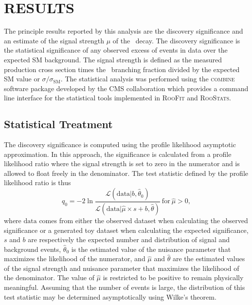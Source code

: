 \chapter{RESULTS} \label{results}

The principle results reported by this analysis are the discovery significance and an estimate of the signal strength $\mu$ of the \VHbb\ decay. The discovery significance is the statistical significance of any observed excess of events in data over the expected SM background. The signal strength is defined as the measured production cross section times the \Htobb\ branching fraction divided by the expected SM value or $\sigma / \sigma_{\textrm{SM}}$. The statistical analysis was performed using the \textsc{combine}\cite{HIGGSCOMBINE} software package developed by the CMS collaboration which provides a command line interface for the statistical tools implemented in \textsc{RooFit}\cite{ROOFIT} and \textsc{RooStats}\cite{ROOSTATS}.

\section{Statistical Treatment}

The discovery significance is computed using the profile likelihood asymptotic approximation.\cite{STATS1,FITRES2,FITRES3,FITRES4} In this approach, the significance is calculated from a profile likelihood ratio where the signal strength is set to zero in the numerator and is allowed to float freely in the denominator. The test statistic defined by the profile likelihood ratio is thus
\begin{equation}
  q_{0} = -2 \ln \frac{\mathcal{L}\left( \textrm{data} | b, \hat{\theta}_{0} \right)}{\mathcal{L}\left( \textrm{data} | \hat{\mu} \times s + b, \hat{\theta} \right)}\ \mathrm{for}\ \hat{\mu} > 0,
  \label{eq:proflikeapprox}
\end{equation}
where $\textrm{data}$ comes from either the observed dataset when calculating the observed significance or a generated toy dataset when calculating the expected significance, $s$ and $b$ are respectively the expected number and distribution of signal and background events, $\hat{\theta}_{0}$ is the estimated value of the nuisance parameter that maximizes the likelihood of the numerator, and $\hat{\mu}$ and $\hat{\theta}$ are the estimated values of the signal strength and nuisance parameter that maximizes the likelihood of the denominator. The value of $\hat{\mu}$ is restricted to be positive to remain physically meaningful. Assuming that the number of events is large, the distribution of this test statistic may be determined asymptotically using Wilke's theorem.

